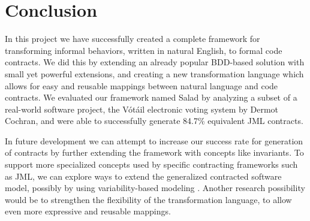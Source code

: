 \section{Conclusion}
In this project we have successfully created a complete framework for transforming informal behaviors, written in natural English, to formal code contracts.
We did this by extending an already popular BDD-based solution with small yet powerful extensions, and creating a new transformation language which
allows for easy and reusable mappings between natural language and code contracts.
We evaluated our framework named Salad by analyzing a subset of a real-world software project, the V\'{o}t\'{a}il electronic voting system by Dermot Cochran, and were able to successfully generate
84.7\% equivalent JML contracts.

In future development we can attempt to increase our success rate for generation of contracts by further extending the framework with concepts like invariants.
To support more specialized concepts used by specific contracting frameworks such as JML,
we can explore ways to extend the generalized contracted software model, possibly by using variability-based modeling \cite{czarnecki2012cool}.
Another research possibility would be to strengthen the flexibility of the transformation language, to allow even more expressive and reusable
mappings.
